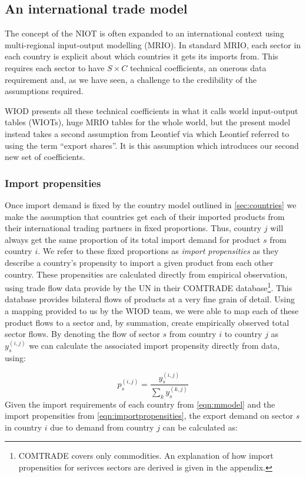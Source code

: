 \documentclass[a4paper]{article}
\begin{document}
\subsection{An international trade model}\label{sec:trade}
The concept of the NIOT is often expanded to an international context using multi-regional input-output modelling (MRIO). In standard MRIO, each sector in each country is explicit about which countries it gets its imports from. 
This requires each sector to have $S \times C$ technical coefficients, an onerous data requirement and, as we have seen, a challenge to the credibility of the assumptions required. 

WIOD presents all these technical coefficients in what it calls world input-output tables (WIOTs), huge MRIO tables for the whole world, but the present model instead takes a second assumption from Leontief via \textcite{duchin_international_2004} which Leontief referred to using the term ``export shares''.
It is this assumption which introduces our second new set of coefficients.

\subsubsection*{Import propensities}
Once import demand is fixed by the country model outlined in \cref{sec:countries} we make the assumption that countries get each of their imported products from their international trading partners in fixed proportions.
Thus, country $j$ will always get the same proportion of its total import demand for product $s$ from country $i$.
We refer to these fixed proportions as \textit{import propensities} as they describe a country's propensity to import a given product from each other country.
These propensities are calculated directly from empirical observation, using trade flow data provide by the UN in their COMTRADE database\footnote{COMTRADE covers only commodities. An explanation of how import propensities for serivces sectors are derived is given in the appendix.}.
This database provides bilateral flows of products at a very fine grain of detail.
Using a mapping provided to us by the WIOD team, we were able to map each of these product flows to a sector and, by summation, create empirically observed total sector flows.
By denoting the flow of sector $s$ from country $i$ to country $j$ as $y_s^{(i,j)}$ we can calculate the associated import propensity directly from data, using:

\begin{equation}\label{eqn:importpropensities}
p^{(i,j)}_s = \frac{y^{(i,j)}_s}{\sum_k{y^{(k,j)}_s}}
\end{equation}
Given the import requirements of each country from \cref{eqn:mmodel} and the import propensities from \cref{eqn:importpropensities}, the export demand on sector $s$ in country $i$ due to demand from country $j$ can be calculated as:
\end{document}
